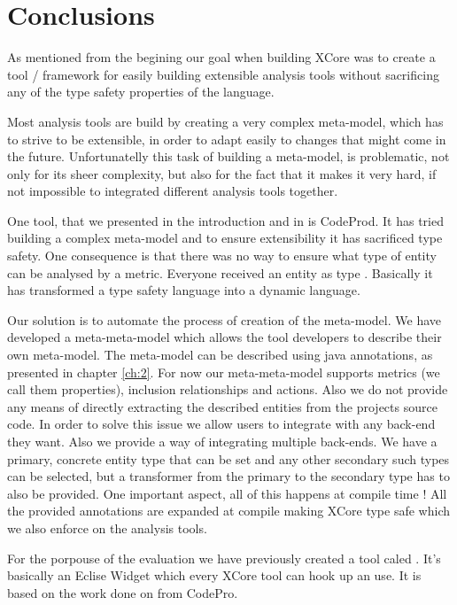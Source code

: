 \chapter{Conclusions}\label{conclusions}

        As mentioned from the begining our goal when building XCore was to create a tool / framework
for easily building extensible analysis tools without sacrificing any of the type safety properties
of the language. 

        Most analysis tools are build by creating a very complex meta-model, which has to strive to be
extensible, in order to adapt easily to changes that might come in the future. Unfortunatelly this task
of building a meta-model, is problematic, not only for its sheer complexity, but also for the fact that 
it makes it very hard, if not impossible to integrated different analysis tools together. 

        One tool, that we presented in the introduction and in \cite{oldThesis} is CodeProd. It has tried
building a complex meta-model and to ensure extensibility it has sacrificed type safety. One consequence is
that there was no way to ensure what type of entity can be analysed by a metric. Everyone received an entity
as type . Basically it has transformed a type safety language into a dynamic language. 

        Our solution is to automate the process of creation of the meta-model. We have developed a meta-meta-model
which allows the tool developers to describe their own meta-model. The meta-model can be described using java annotations, as presented in
chapter \ref{ch:2}. For now our meta-meta-model supports  metrics (we call them properties), inclusion relationships and actions.
Also we do not provide any means of directly extracting the described entities from the projects source code. In order to solve this issue
we allow users to integrate with any back-end they want.  Also we provide a way of integrating multiple back-ends. We have a primary, concrete
entity type that can be set and any other secondary such types can be selected, but a transformer from the primary to the secondary type has
to also be provided. One important aspect, all of this happens at compile time ! All the provided annotations are expanded at compile making
XCore type safe which we also enforce on the analysis tools. 

        For the porpouse of the evaluation we have previously created a tool caled . It's basically an Eclise Widget which 
every XCore tool can hook up an use. It is based on the work done on  from CodePro.

